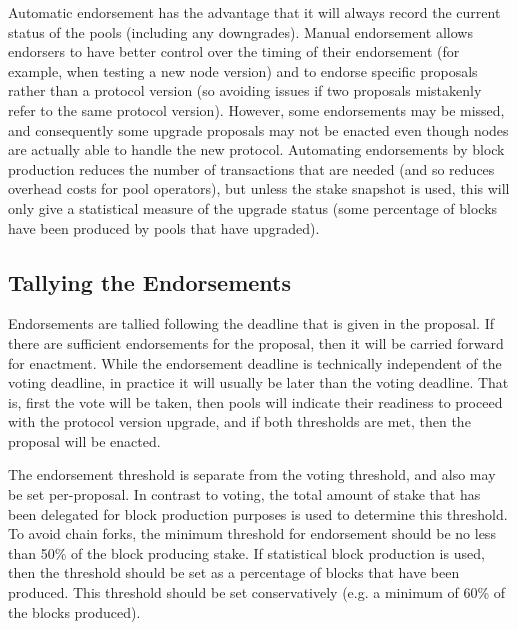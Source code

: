 Automatic endorsement has the advantage that it will always record the current
status of the pools (including any downgrades).
Manual endorsement allows endorsers to have better control over
the timing of their endorsement (for example, when testing a new node version)
and to endorse specific proposals rather than a protocol version (so avoiding issues if two proposals
mistakenly refer to the same protocol version).  However, some
endorsements may be missed, and consequently some upgrade proposals may not be enacted
even though nodes are actually able to handle the new protocol.
Automating endorsements by block production reduces the number of transactions that are needed (and so reduces overhead costs for pool operators),
but unless the stake snapshot is used, this will only give a statistical measure of the upgrade status (some percentage of blocks have been produced by
pools that have upgraded).

\subsection{Tallying the Endorsements}

Endorsements are tallied following the deadline that is given in the proposal.
If there are sufficient endorsements for the proposal, then it will be carried
forward for enactment.  While the endorsement deadline is technically
independent of the voting deadline, in practice it will usually be later than the
voting deadline. That is, first the vote will be taken, then pools will indicate
their readiness to proceed with the protocol version upgrade, and if both thresholds are met,
then the proposal will be enacted.

The endorsement threshold is separate from the voting threshold, and also
may be set per-proposal.  %
In contrast to voting, the total amount of stake that has been delegated for block production purposes is used to determine this
threshold. 
To avoid chain forks, the minimum threshold for endorsement should be no less than 50\%
of the block producing stake.
If statistical block production is used, then the threshold should be set as a percentage of blocks that have been produced.
This threshold should be set conservatively (e.g. a minimum of 60\% of the blocks produced).
